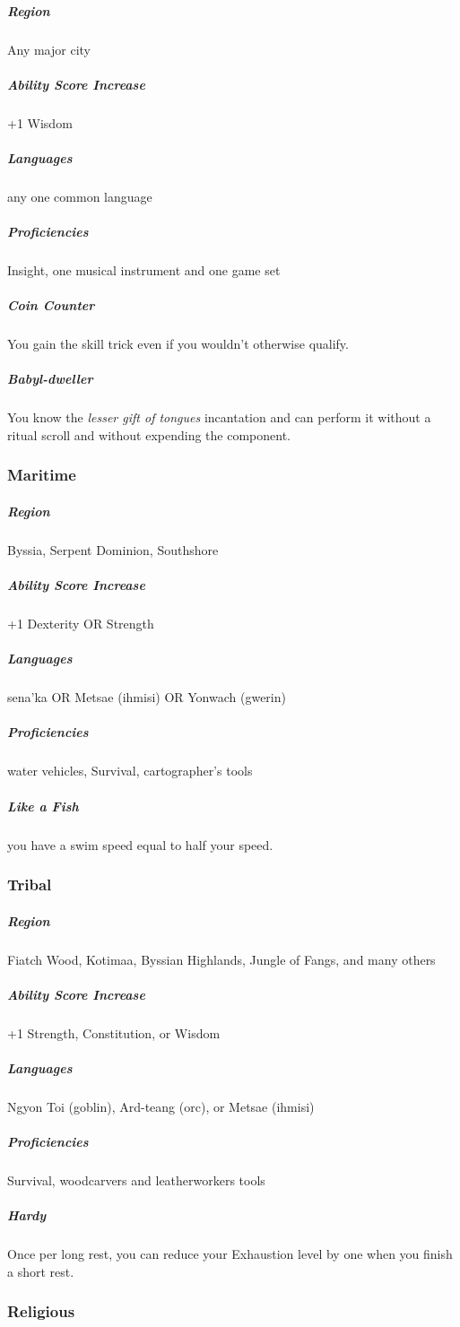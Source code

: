\subparagraph*{Region} Any major city

\subparagraph*{Ability Score Increase} +1 Wisdom

\subparagraph*{Languages} any one common language

\subparagraph*{Proficiencies} Insight, one musical instrument and one game set

\subparagraph*{Coin Counter} You gain the  skill trick even if you wouldn't otherwise qualify.

\subparagraph*{Babyl-dweller} You know the \textit{lesser gift of tongues} incantation and can perform it without a ritual scroll and without expending the component.

\subsubsection{Maritime}

\subparagraph*{Region} Byssia, Serpent Dominion, Southshore

\subparagraph*{Ability Score Increase} +1 Dexterity OR Strength

\subparagraph*{Languages} sena'ka OR Metsae (ihmisi) OR Yonwach (gwerin)

\subparagraph*{Proficiencies} water vehicles, Survival, cartographer's tools

\subparagraph*{Like a Fish} you have a swim speed equal to half your speed.

\subsubsection{Tribal}

\subparagraph*{Region} Fiatch Wood, Kotimaa, Byssian Highlands, Jungle of Fangs, and many others

\subparagraph*{Ability Score Increase} +1 Strength, Constitution, or Wisdom

\subparagraph*{Languages} Ngyon Toi (goblin), Ard-teang (orc), or Metsae (ihmisi)

\subparagraph*{Proficiencies} Survival, woodcarvers and leatherworkers tools

\subparagraph*{Hardy} Once per long rest, you can reduce your Exhaustion level by one when you finish a short rest.

\subsubsection{Religious}

